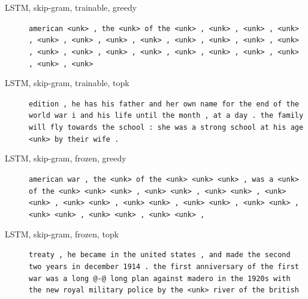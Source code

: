 \begin{description}
\item[LSTM, skip-gram, trainable, greedy] \texttt{\small american \textless{}unk\textgreater{} , the \textless{}unk\textgreater{} of the \textless{}unk\textgreater{} , \textless{}unk\textgreater{} , \textless{}unk\textgreater{} , \textless{}unk\textgreater{} , \textless{}unk\textgreater{} , \textless{}unk\textgreater{} , \textless{}unk\textgreater{} , \textless{}unk\textgreater{} , \textless{}unk\textgreater{} , \textless{}unk\textgreater{} , \textless{}unk\textgreater{} , \textless{}unk\textgreater{} , \textless{}unk\textgreater{} , \textless{}unk\textgreater{} , \textless{}unk\textgreater{} , \textless{}unk\textgreater{} , \textless{}unk\textgreater{} , \textless{}unk\textgreater{} , \textless{}unk\textgreater{} , \textless{}unk\textgreater{} , \textless{}unk\textgreater{} , \textless{}unk\textgreater{}}
\item[LSTM, skip-gram, trainable, topk] \texttt{\small edition , he has his father and her own name for the end of the world war i and his life until the month , at a day . the family will fly towards the school : she was a strong school at his age \textless{}unk\textgreater{} by their wife .}
\item[LSTM, skip-gram, frozen, greedy] \texttt{\small american war , the \textless{}unk\textgreater{} of the \textless{}unk\textgreater{} \textless{}unk\textgreater{} \textless{}unk\textgreater{} , was a \textless{}unk\textgreater{} of the \textless{}unk\textgreater{} \textless{}unk\textgreater{} \textless{}unk\textgreater{} , \textless{}unk\textgreater{} \textless{}unk\textgreater{} , \textless{}unk\textgreater{} \textless{}unk\textgreater{} , \textless{}unk\textgreater{} \textless{}unk\textgreater{} , \textless{}unk\textgreater{} \textless{}unk\textgreater{} , \textless{}unk\textgreater{} \textless{}unk\textgreater{} , \textless{}unk\textgreater{} \textless{}unk\textgreater{} , \textless{}unk\textgreater{} \textless{}unk\textgreater{} , \textless{}unk\textgreater{} \textless{}unk\textgreater{} , \textless{}unk\textgreater{} \textless{}unk\textgreater{} , \textless{}unk\textgreater{} \textless{}unk\textgreater{} ,}
\item[LSTM, skip-gram, frozen, topk] \texttt{\small treaty , he became in the united states , and made the second two years in december 1914 . the first anniversary of the first war was a long @-@ long plan against madero in the 1920s with the new royal military police by the \textless{}unk\textgreater{} river of the british}

\end{description}
